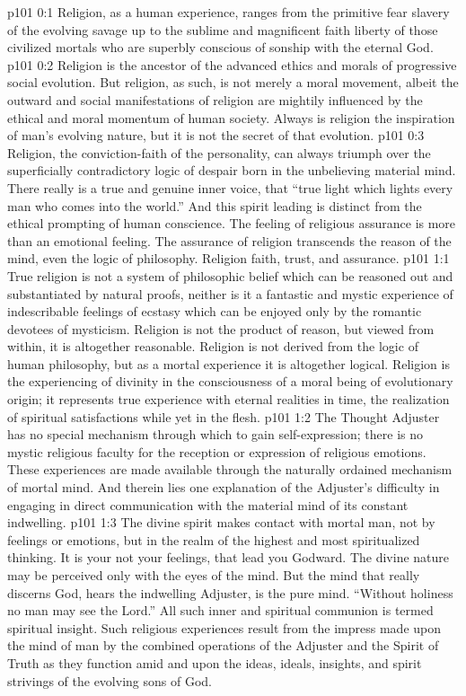 \author{Melchizedek}
\vs p101 0:1 Religion, as a human experience, ranges from the primitive fear slavery of the evolving savage up to the sublime and magnificent faith liberty of those civilized mortals who are superbly conscious of sonship with the eternal God.
\vs p101 0:2 Religion is the ancestor of the advanced ethics and morals of progressive social evolution. But religion, as such, is not merely a moral movement, albeit the outward and social manifestations of religion are mightily influenced by the ethical and moral momentum of human society. Always is religion the inspiration of man’s evolving nature, but it is not the secret of that evolution.
\vs p101 0:3 Religion, the conviction\hyp{}faith of the personality, can always triumph over the superficially contradictory logic of despair born in the unbelieving material mind. There really is a true and genuine inner voice, that “true light which lights every man who comes into the world.” And this spirit leading is distinct from the ethical prompting of human conscience. The feeling of religious assurance is more than an emotional feeling. The assurance of religion transcends the reason of the mind, even the logic of philosophy. Religion  faith, trust, and assurance.
\vs p101 1:1 True religion is not a system of philosophic belief which can be reasoned out and substantiated by natural proofs, neither is it a fantastic and mystic experience of indescribable feelings of ecstasy which can be enjoyed only by the romantic devotees of mysticism. Religion is not the product of reason, but viewed from within, it is altogether reasonable. Religion is not derived from the logic of human philosophy, but as a mortal experience it is altogether logical. Religion is the experiencing of divinity in the consciousness of a moral being of evolutionary origin; it represents true experience with eternal realities in time, the realization of spiritual satisfactions while yet in the flesh.
\pc \vs p101 1:2 The Thought Adjuster has no special mechanism through which to gain self\hyp{}expression; there is no mystic religious faculty for the reception or expression of religious emotions. These experiences are made available through the naturally ordained mechanism of mortal mind. And therein lies one explanation of the Adjuster’s difficulty in engaging in direct communication with the material mind of its constant indwelling.
\vs p101 1:3 The divine spirit makes contact with mortal man, not by feelings or emotions, but in the realm of the highest and most spiritualized thinking. It is your  not your feelings, that lead you Godward. The divine nature may be perceived only with the eyes of the mind. But the mind that really discerns God, hears the indwelling Adjuster, is the pure mind. “Without holiness no man may see the Lord.” All such inner and spiritual communion is termed spiritual insight. Such religious experiences result from the impress made upon the mind of man by the combined operations of the Adjuster and the Spirit of Truth as they function amid and upon the ideas, ideals, insights, and spirit strivings of the evolving sons of God.
